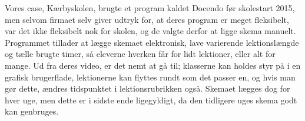 Vores case, Kærbyskolen, brugte et program kaldet Docendo før skolestart 2015, men selvom firmaet selv giver udtryk for, at deres program er meget fleksibelt\cite{Docendo}, var det ikke fleksibelt nok for skolen, og de valgte derfor at ligge skema manuelt. Programmet tillader at lægge skemaet elektronisk, lave varierende lektionslængde og tælle brugte timer, så eleverne hverken får for lidt lektioner, eller alt for mange. Ud fra deres video\cite{Docendo_video}, er det nemt at gå til; klasserne kan holdes styr på i en grafisk brugerflade, lektionerne kan flyttes rundt som det passer en, og hvis man gør dette, ændres tidspunktet i lektionsrubrikken også. Skemaet lægges dog for hver uge, men dette er i sidste ende ligegyldigt, da den tidligere uges skema godt kan genbruges.
